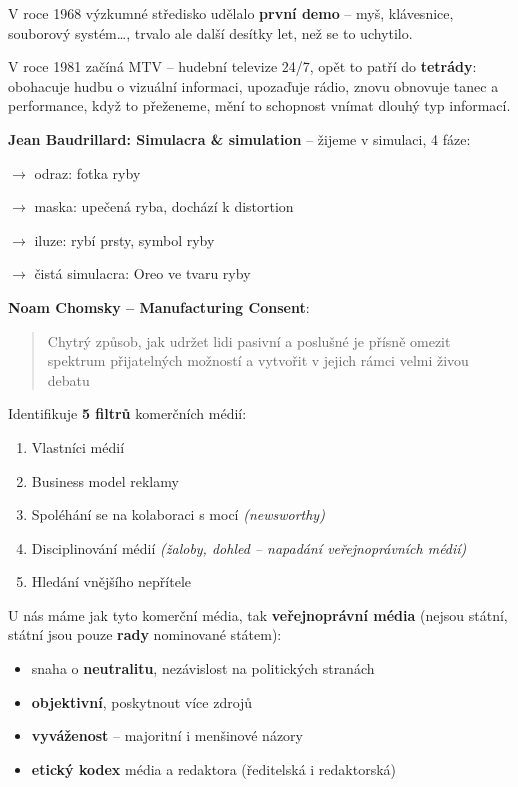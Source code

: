\vspace{4pt}
\noindent V roce 1968 výzkumné středisko udělalo \textbf{první demo} -- myš, klávesnice, souborový systém\ldots, trvalo ale další desítky let, než se to uchytilo.

V roce 1981 začíná MTV -- hudební televize 24/7, opět to patří do \textbf{tetrády}: obohacuje hudbu o vizuální informaci, upozaďuje rádio, znovu obnovuje tanec a performance, když to přeženeme, mění to schopnost vnímat dlouhý typ informací.

\vspace{4pt}
\noindent \textbf{Jean Baudrillard: Simulacra \& simulation} -- žijeme v simulaci, 4 fáze:

$\to$ odraz: fotka ryby

$\to$ maska: upečená ryba, dochází k distortion

$\to$ iluze: rybí prsty, symbol ryby

$\to$ čistá simulacra: Oreo ve tvaru ryby

\vspace{4pt}
\noindent \textbf{Noam Chomsky -- Manufacturing Consent}: \blockquote{Chytrý způsob, jak udržet lidi pasivní a poslušné je přísně omezit spektrum přijatelných možností a vytvořit v jejich rámci velmi živou debatu}

\vspace{8pt}
\noindent Identifikuje \textbf{5 filtrů} komerčních médií:

\begin{enumerate}
    \item Vlastníci médií
    \item Business model reklamy
    \item Spoléhání se na kolaboraci s mocí \textit{(newsworthy)}
    \item Disciplinování médií \textit{(žaloby, dohled -- napadání veřejnoprávních médií)}
    \item Hledání vnějšího nepřítele
\end{enumerate}

\noindent U nás máme jak tyto komerční média, tak \textbf{veřejnoprávní média} (nejsou státní, státní jsou pouze \textbf{rady} nominované státem):

\begin{itemize}
    \item snaha o \textbf{neutralitu}, nezávislost na politických stranách
    \item \textbf{objektivní}, poskytnout více zdrojů
    \item \textbf{vyváženost} -- majoritní i menšinové názory
    \item \textbf{etický kodex} média a redaktora (ředitelská i redaktorská)
\end{itemize}

